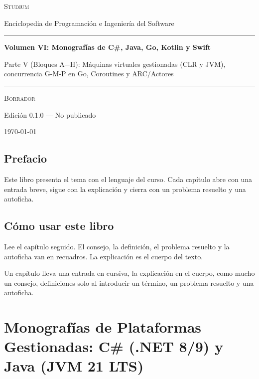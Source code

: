 \documentclass{book}
\begin{document}
\frontmatter
\thispagestyle{empty}
\setlength{\parindent}{0pt}
\vspace*{0.08\textheight}
{\normalsize\scshape\color{studiumInk} Studium\par}
{\small Enciclopedia de Programación e Ingeniería del Software\par}
\vspace{0.55em}
{\color{studiumRule}\rule{\linewidth}{0.9pt}\par}
\vspace{0.16\textheight}
{\raggedright\Huge\bfseries Volumen VI: Monografías de C\#, Java, Go, Kotlin y Swift\par}
\vspace{0.9em}
{\raggedright\Large\color{studiumInk} Parte V (Bloques A\(-\)H): Máquinas virtuales gestionadas (CLR y JVM), concurrencia G-M-P en Go, Coroutines y ARC/Actores\par}
\vfill
{\color{studiumRule}\rule{0.36\linewidth}{0.45pt}\par}
\vspace{1.05em}
{\large\scshape Borrador\par}
\vspace{0.45em}
{\normalsize Edición 0.1.0 --- No publicado\par}
\vspace{0.4em}
{\normalsize\today\par}
\vspace*{0.08\textheight}
\clearpage
\chapter{Prefacio}
\noindent Este libro presenta el tema con el lenguaje del curso. Cada capítulo abre con una entrada breve, sigue con la explicación y cierra con un problema resuelto y una autoficha.
\chapter{Cómo usar este libro}
\noindent Lee el capítulo seguido. El consejo, la definición, el problema resuelto y la autoficha van en recuadros. La explicación es el cuerpo del texto.

\noindent Un capítulo lleva una entrada en cursiva, la explicación en el cuerpo, como mucho un consejo, definiciones solo al introducir un término, un problema resuelto y una autoficha.
\tableofcontents
\mainmatter

\part{Monografías de Plataformas Gestionadas: C\# (.NET 8/9) y Java (JVM 21 LTS)}
\end{document}
